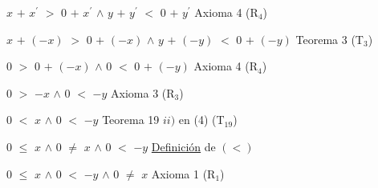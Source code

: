\documentclass[12pt]{article}
\begin{document}
$x$ $+$ $x^{\prime}$ $>$ $0$ $+$ $x^{\prime}$ \hspace{0.2cm} $\wedge$ \hspace{0.2cm} $y$ $+$ $y^{\prime}$ $<$ $0$ $+$ $y^{\prime}$ \hspace{3.1cm} {\textcolor{carrotorange}{Axioma 4 (R$_{4}$)}} \vspace{0.5cm}

$x$ $+$ $(-x)$ $>$ $0$ $+$ $(-x)$ \hspace{0.2cm} $\wedge$ \hspace{0.2cm} $y$ $+$ $(-y)$ $<$ $0$ $+$ $(-y)$ \hspace{0.4cm} {\textcolor{carrotorange}{Teorema 3 (T$_{3}$)}} \vspace{0.5cm}

$0$ $>$ $0$ $+$ $(-x)$ \hspace{0.2cm} $\wedge$ \hspace{0.2cm} $0$ $<$ $0$ $+$ $(-y)$ \hspace{4cm} {\textcolor{carrotorange}{Axioma 4 (R$_{4}$)}} \vspace{0.5cm}

$0$ $>$ $-x$ \hspace{0.2cm} $\wedge$ \hspace{0.2cm} $0$ $<$ $-y$ \hspace{6.7cm} {\textcolor{carrotorange}{Axioma 3 (R$_{3}$)}} \vspace{0.5cm}

$0$ $<$ $x$ \hspace{0.2cm} $\wedge$ \hspace{0.2cm} $0$ $<$ $-y$ \hspace{6cm} {\textcolor{carrotorange}{Teorema 19 $ii)$ en (4)  (T$_{19}$)}} \vspace{0.5cm}

$0$ $\leq$ $x$ \hspace{0.2cm} $\wedge$ \hspace{0.2cm} $0$ $\neq$ $x$  \hspace{0.2cm} $\wedge$ \hspace{0.2cm} $0$ $<$ $-y$ \hspace{4.5cm} {\textcolor{carrotorange}{{\underline{Definición} de $(<)$}}} \vspace{0.5cm}

$0$ $\leq$ $x$ \hspace{0.2cm} $\wedge$ \hspace{0.2cm}  $0$ $<$ $-y$ \hspace{0.2cm} $\wedge$ \hspace{0.2cm} $0$ $\neq$ $x$\hspace{4.7cm} {\textcolor{carrotorange}{ Axioma 1 (R$_{1}$)}} \vspace{0.5cm}
\end{document}
